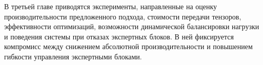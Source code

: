 В третьей главе приводятся эксперименты, направленные на оценку производительности предложенного подхода, стоимости передачи тензоров, эффективности оптимизаций, возможности динамической балансировки нагрузки и поведения системы при отказах экспертных блоков. В ней фиксируется компромисс между снижением абсолютной производительности и повышением гибкости управления экспертными блоками.
